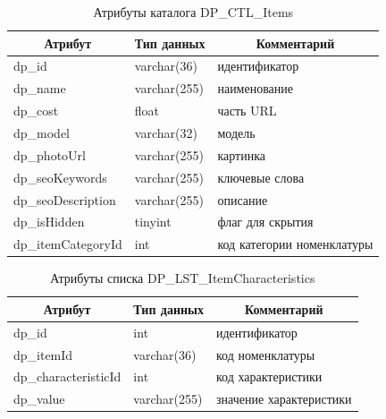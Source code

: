\begin{table}[p]
    \centering\small

    \caption{Атрибуты каталога DP\_CTL\_Items}
    \label{tab:DP_CTL_Items}

    \begin{tabular}{|p{5cm}|p{2.5cm}|p{9cm}|}
        \hline
        \multicolumn{1}{|c|}{Атрибут}
        & \multicolumn{1}{c|}{Тип данных}
        & \multicolumn{1}{c|}{Комментарий}
        \\ \hline

        dp\_id & varchar(36) & идентификатор \\ \hline
        dp\_name & varchar(255) & наименование \\ \hline
        dp\_cost & float & часть URL \\ \hline
        dp\_model & varchar(32) & модель \\ \hline
        dp\_photoUrl & varchar(255) & картинка\\ \hline
        dp\_seoKeywords & varchar(255) & ключевые слова \\ \hline
        dp\_seoDescription & varchar(255) & описание \\ \hline
        dp\_isHidden & tinyint & флаг для скрытия \\ \hline
        dp\_itemCategoryId & int & код категории номенклатуры \\ \hline
    \end{tabular}
\end{table}

\begin{table}[p]
    \centering\small

    \caption{Атрибуты списка DP\_LST\_ItemCharacteristics}
    \label{tab:DP_LST_ItemCharacteristics}

    \begin{tabular}{|p{5cm}|p{2.5cm}|p{9cm}|}
        \hline
        \multicolumn{1}{|c|}{Атрибут}
        & \multicolumn{1}{c|}{Тип данных}
        & \multicolumn{1}{c|}{Комментарий}
        \\ \hline

        dp\_id & int & идентификатор \\ \hline
        dp\_itemId & varchar(36) & код номенклатуры \\ \hline
        dp\_characteristicId & int & код характеристики \\ \hline
        dp\_value & varchar(255) & значение характеристики \\ \hline
    \end{tabular}
\end{table}

